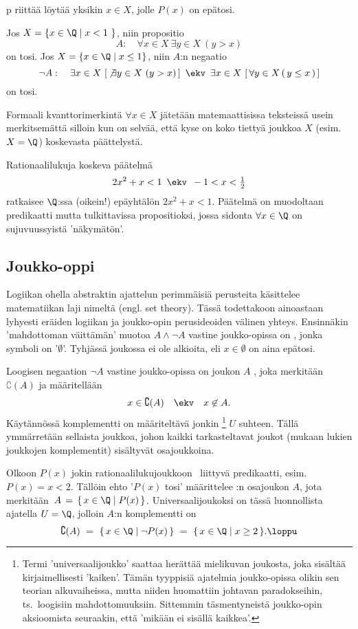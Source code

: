 p riittää löytää yksikin  $ x\in X$, jolle
$P(x)$ on epätosi.
\begin{Exa} Jos $X = \{x \in \Q \mid x < 1\ \}$, niin propositio
\[
A: \quad \forall x \in X\ \exists y \in X\ (y>x)
\]
on tosi. Jos $X = \{x \in \Q \mid x \le 1\}$, niin $A$:n negaatio
\[
\neg A: \quad \exists x \in X\ [\,\not\exists y \in X\ (y>x)\,] \,\ \ekv\,\
              \exists x \in X\ [\,\forall  y\in X\,(\,y \le x\,)\,]
\]
on tosi. \loppu 
\end{Exa}
Formaali kvanttorimerkintä $\forall x \in X$ jätetään matemaattisissa teksteissä usein
merkitsemättä silloin kun on selvää, että kyse on koko tiettyä joukkoa $X$ (esim.\ $X=\Q$)
koskevasta päättelystä.
\begin{Exa} \label{näkymätön kvanttori} Rationaalilukuja koskeva päätelmä
\[
2x^2+x<1\,\ \ekv\,\ -1<x<\tfrac{1}{2}
\]
ratkaisee $\Q$:ssa (oikein!) epäyhtälön $2x^2+x<1$. Päätelmä on muodoltaan predikaatti mutta
tulkittavissa propositioksi, jossa sidonta $\forall x\in\Q$ on sujuvuussyistä 'näkymätön'.
\loppu
\end{Exa} 

\subsection*{Joukko-oppi}
%

Logiikan ohella abstraktin ajattelun perimmäisiä perusteita käsittelee matematiikan laji nimeltä
\kor{joukko-oppi} (engl. set theory). Tässä todettakoon ainoastaan lyhyesti eräiden logiikan ja
joukko-opin perusideoiden välinen yhteys. Ensinnäkin 'mahdottoman väittämän' muotoa 
$A \wedge \neg A$ vastine joukko-opissa on
%
, jonka symboli on '$\emptyset$'. 
Tyhjässä joukossa ei ole alkioita, eli $x \in \emptyset$ on aina epätosi. 
 
Loogisen negaation $\neg A$ vastine joukko-opissa on joukon $A$ 
\index{komplementti (joukon)}%
, joka merkitään $\complement(A)$ ja määritellään
\[
x \in \complement(A) \quad \ekv \quad x \not\in A.
\]
Käytännössä komplementti on määriteltävä jonkin
%
\footnote[2]{Termi 
'universaalijoukko' saattaa herättää mielikuvan joukosta, joka sisältää kirjaimellisesti 
'kaiken'. Tämän tyyppisiä ajatelmia joukko-opissa olikin sen teorian alkuvaiheissa, mutta niiden
huomattiin johtavan paradokseihin, ts.\ loogisiin mahdottomuuksiin. Sittemmin täsmentyneistä 
joukko-opin aksioomista seuraakin, että 'mikään ei sisällä kaikkea'.} $U$ suhteen. Tällä
ymmärretään sellaista joukkoa, johon kaikki tarkasteltavat joukot (mukaan lukien joukkojen 
komplementit) sisältyvät osajoukkoina. 
\begin{Exa} Olkoon $P(x)$ jokin rationaalilukujoukkoon \Q\ liittyvä predikaatti, esim.\ 
$P(x) = x<2$. Tällöin ehto '$P(x)$ tosi' määrittelee \Q:n osajoukon $A$, jota merkitään
$\,A\,=\,\{\,x \in \Q \mid P(x)\,\}$. Universaalijoukoksi on tässä luonnollista ajatella
$U=\Q$, jolloin $A$:n komplementti on
\[
\complement(A)\ =\ \{\,x \in \Q \mid \neg P(x)\,\}\ 
                =\ \{\,x \in \Q \mid x \ge 2\,\}. \loppu 
\] \end{Exa}

